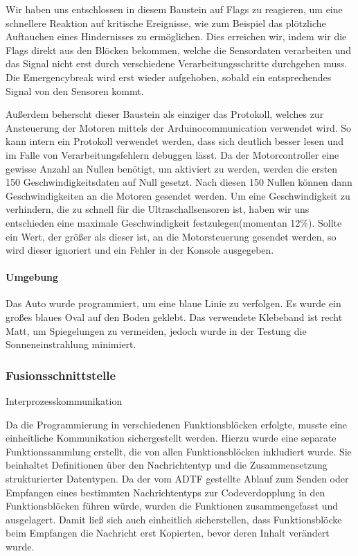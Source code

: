 \documentclass[12pt, a4paper]{scrartcl}
\begin{document}
Wir haben uns entschlossen in diesem Baustein auf Flags zu reagieren, um eine schnellere Reaktion auf kritische Ereignisse, wie zum Beispiel das plötzliche Auftauchen eines Hindernisses zu ermöglichen. Dies erreichen wir, indem wir die Flags direkt aus den Blöcken bekommen, welche die Sensordaten verarbeiten und das Signal nicht erst durch verschiedene Verarbeitungsschritte durchgehen muss. Die Emergencybreak wird erst wieder aufgehoben, sobald ein entsprechendes Signal von den Sensoren kommt.

Außerdem beherscht dieser Baustein als einziger das Protokoll, welches zur Ansteuerung der Motoren mittels der Arduinocommunication verwendet wird. So kann intern ein Protokoll verwendet werden, dass sich deutlich besser lesen und im Falle von Verarbeitungsfehlern debuggen lässt. Da der Motorcontroller eine gewisse Anzahl an Nullen benötigt, um aktiviert zu werden, werden die ersten 150 Geschwindigkeitsdaten auf Null gesetzt. Nach diesen 150 Nullen können dann Geschwindigkeiten an die Motoren gesendet werden. Um eine Geschwindigkeit zu verhindern, die zu schnell für die Ultraschallsensoren ist, haben wir uns entschieden eine maximale Geschwindigkeit festzulegen(momentan 12\%). Sollte ein Wert, der größer als dieser ist, an die Motorsteuerung gesendet werden, so wird dieser ignoriert und ein Fehler in der Konsole ausgegeben.

\paragraph{Umgebung}
Das Auto wurde programmiert, um eine blaue Linie zu verfolgen. Es wurde ein großes blaues Oval auf den Boden geklebt. Das verwendete Klebeband ist recht Matt, um Spiegelungen zu vermeiden, jedoch wurde in der Testung die Sonneneinstrahlung minimiert.


\subsubsection{Fusionsschnittstelle}
Interprozesskommunikation

Da die Programmierung in verschiedenen Funktionsblöcken erfolgte, musste eine einheitliche Kommunikation sichergestellt werden. Hierzu wurde eine separate Funktionssammlung erstellt, die von allen Funktionsblöcken inkludiert wurde. Sie beinhaltet Definitionen über den Nachrichtentyp und die Zusammensetzung strukturierter Datentypen. Da der vom ADTF gestellte Ablauf zum Senden oder Empfangen eines bestimmten Nachrichtentyps zur Codeverdopplung in den Funktionsblöcken führen würde, wurden die Funktionen zusammengefasst und ausgelagert. Damit ließ sich auch einheitlich sicherstellen, dass Funktionsblöcke beim Empfangen die Nachricht erst Kopierten, bevor deren Inhalt verändert wurde.
\end{document}
